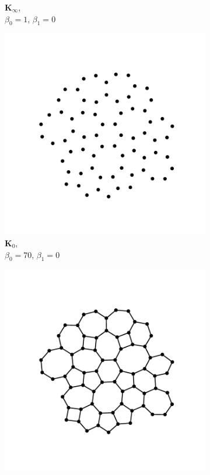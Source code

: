 \begin{figure}[tb]
\begin{subfigure}[b]{0.22\textwidth}
         \caption{$\mathbf{K}_\infty$,\\ $\beta_0=1$, $\beta_1=0$}
         \label{fig:phexd}
     \end{subfigure}
     
     \vspace{0.5cm}
     \begin{subfigure}[b]{0.22\textwidth}
         \centering
         \includegraphics[width=\textwidth]{./figures/ph/ph_ex_amorph_0.pdf}
         \caption{$\mathbf{K}_0$,\\ $\beta_0=70$, $\beta_1=0$}
         \label{fig:phexe}
     \end{subfigure}
     \hfill
      \begin{subfigure}[b]{0.22\textwidth}
         \centering
         \includegraphics[width=\textwidth]{./figures/ph/ph_ex_amorph_12.pdf}

\end{subfigure}
\end{figure}

